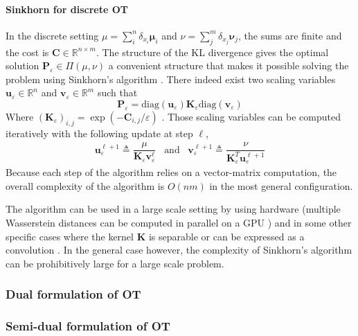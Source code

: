 \paragraph{Sinkhorn for discrete OT}
In the discrete setting $\mu = \sum_i^n\delta_{x_i}\bm{\mu}_i$ and $\nu = \sum_j^m\delta_{x_j}\bm{\nu}_j$, the sums are finite and the cost is $\mathbf{C} \in \mathbb{R}^{n\times m}$. The structure of the KL divergence gives the optimal solution $\mathbf{P}_\varepsilon \in \Pi(\mu, \nu)$ a convenient structure that makes it possible solving the problem using Sinkhorn's algorithm \cite{cuturi_sinkhorn_2013}. There indeed exist two scaling variables $\mathbf{u}_\varepsilon \in \mathbb{R}^n$ and $\mathbf{v}_\varepsilon \in \mathbb{R}^m$ such that
\[
\mathbf{P}_\varepsilon = \text{diag}(\mathbf{u}_\varepsilon)\mathbf{K}_\varepsilon\text{diag}(\mathbf{v}_\varepsilon)
\]
Where $(\mathbf{K}_\varepsilon)_{i,j} = \exp(-\mathbf{C}_{i,j}/\varepsilon)$ \cite{peyre_computational_2018}. Those scaling variables can be computed iteratively with the following update at step $\ell$,
\begin{gather}
\mathbf{u}^{\ell+1}_\varepsilon \triangleq \dfrac{\mu}{\mathbf{K}_\varepsilon\mathbf{v}^\ell_\varepsilon} \hspace{10pt}  \text{and} \hspace{10pt}\mathbf{v}^{\ell+1}_\varepsilon \triangleq \dfrac{\nu}{\mathbf{K}^T_\varepsilon\mathbf{u}^{\ell+1}_\varepsilon}
\end{gather}
Because each step of the algorithm relies on a vector-matrix computation, the overall complexity of the algorithm is $O(nm)$ in the most general configuration.

The algorithm can be used in a large scale setting by using hardware (multiple Wasserstein distances can be computed in parallel on a GPU \cite{slomp2011gpu}) and in some other specific cases where the kernel $\mathbf{K}$ is separable or can be expressed as a convolution \cite{peyre_computational_2018}. In the general case however, the complexity of Sinkhorn's algorithm can be prohibitively large for a large scale problem.

\subsubsection{Dual formulation of OT}

\subsubsection{Semi-dual formulation of OT}
